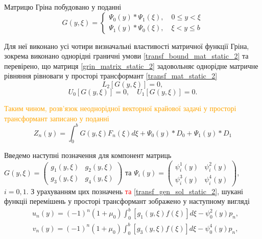 Матрицю Гріна побудовано у поданні
\begin{equation}\label{grin_matrix_static_2}
    G(y,\xi) = 
    \begin{cases}
        \Psi_0(y) * \Psi_1(\xi), \quad 0 \le y < \xi \\
        \Psi_1(y) * \Psi_0(\xi), \quad \xi < y \le b
    \end{cases}
\end{equation}

Для неї виконано усі чотири визначальні властивості матричної функції Гріна, зокрема виконано однорідні граничні умови \eqref{transf_bound_mat_static_2}
та перевірено, що матриця \eqref{grin_matrix_static_2} задовольняє однорідне матричне рівняння рівноваги у просторі трансформант \eqref{transf_mat_static_2}
\begin{equation*}
    L_2\left[  G(y, \xi) \right] = 0,
\end{equation*}
\begin{equation*}
    U_0\left[ G(y, \xi) \right] = 0, \quad  U_1\left[ G(y, \xi) \right] = 0.
\end{equation*}

\textcolor{orange}{Таким чином, розв'язок неоднорідної векторної крайової задачі у просторі трансформант записано у поданні \cite{popov_2}}
\begin{equation}
    Z_n(y) = \int_0^b G(y,\xi) F_n(\xi) d\xi + \Psi_0(y) * D_0 + \Psi_1(y) * D_1
\end{equation}

Введемо наступні позначення для компонент матриць \newline $G(y, \xi) = \begin{pmatrix}
    g_1(y,\xi) & g_2(y,\xi) \\
    g_3(y,\xi) & g_4(y,\xi)
\end{pmatrix}$ та $\Psi_i(y) = \begin{pmatrix}
    \psi_i^1(y) & \psi_i^2(y) \\
    \psi_i^3(y) & \psi_i^4(y)
\end{pmatrix}$, $i=0,1$.
\newline З урахуванням цих позначень \textcolor{red}{та \eqref{transf_gen_sol_static_2}}, шукані функціі перемішень у просторі трансформант зображено у наступному вигляді
\begin{align}\label{transf_sol_u_static_2}
    &u_n(y) = (-1)^n (1+\mu_0) \int_0^b \left[g_1(y, \xi)f(\xi)\right]d\xi - \psi_0^2(y) p_n,
\end{align}
\begin{align}\label{transf_sol_v_static_2}
    &v_n(y) = (-1)^n (1+\mu_0)  \int_0^b \left[g_3(y, \xi)f(\xi) \right]d\xi - \psi_0^4(y) p_n,
\end{align}


